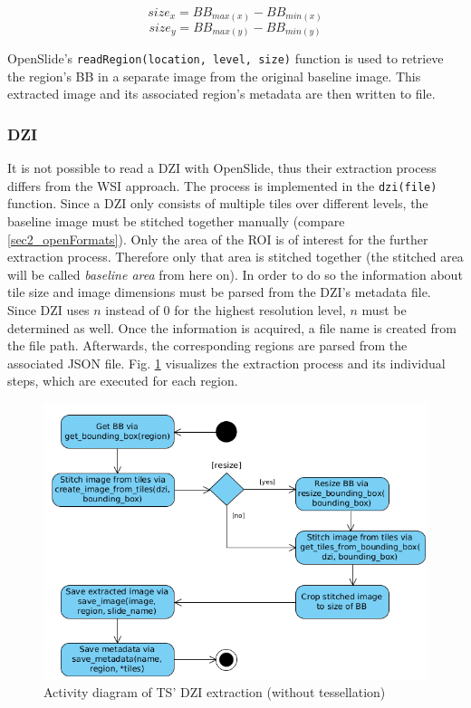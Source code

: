 \begin{equation}\label{eq:sizeX}
size_x = BB_{max(x)} - BB_{min(x)}
\end{equation}
\begin{equation}\label{eq:sizey}
size_y = BB_{max(y)} - BB_{min(y)}
\end{equation}

OpenSlide's \texttt{readRegion(location, level, size)} function is used to retrieve the region's BB in a separate image from the original baseline image. This extracted image and its associated region's metadata are then written to file.

\subsubsection{DZI}
It is not possible to read a DZI with OpenSlide, thus their extraction process differs from the WSI approach. The process is implemented in the \texttt{dzi(file)} function. Since a DZI only consists of multiple tiles over different levels, the baseline image must be stitched together manually (compare \ref{sec2_openFormats}). Only the area of the ROI is of interest for the further extraction process. Therefore only that area is stitched together (the stitched area will be called \emph{baseline area} from here on). In order to do so the information about tile size and image dimensions must be parsed from the DZI's metadata file. Since DZI uses $n$ instead of $0$ for the highest resolution level, $n$ must be determined as well. Once the information is acquired, a file name is created from the file path. Afterwards, the corresponding regions are parsed from the associated JSON file. Fig. \ref{fig5_tsDziUml} visualizes the extraction process and its individual steps, which are executed for each region.

\begin{figure}[!h]
	\begin{center}
		\includegraphics[scale=0.45]{img/ts_dzi_uml.png}
		\caption{Activity diagram of TS' DZI extraction (without tessellation)}
		\label{fig5_tsDziUml}
	\end{center}
\end{figure}

